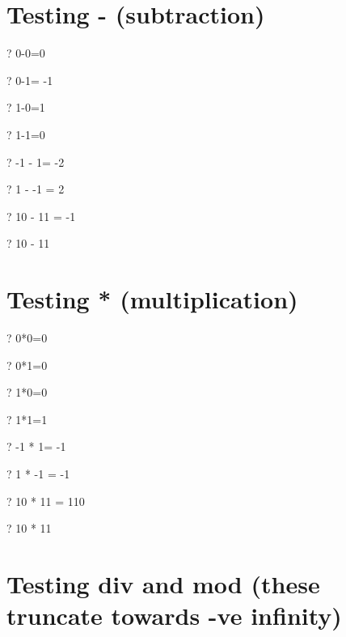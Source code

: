 \documentclass{article}
\newcommand{\negate}{-}
\begin{document}
\section{Testing - (subtraction)}
\begin{zed} \vdash?   0-0=0 \end{zed}
\begin{zed} \vdash?   0-1= \negate 1 \end{zed}
\begin{zed} \vdash?   1-0=1 \end{zed}
\begin{zed} \vdash?   1-1=0 \end{zed}
\begin{zed} \vdash?   \negate 1 - 1= \negate 2 \end{zed}
\begin{zed} \vdash?   1 - \negate 1 = 2 \end{zed}
\begin{zed} \vdash?   10 - 11 = \negate 1 \end{zed}
\begin{zed} \vdash?   10 - 11  \end{zed}


\section{Testing * (multiplication)}
\begin{zed} \vdash?   0*0=0 \end{zed}
\begin{zed} \vdash?   0*1=0 \end{zed}
\begin{zed} \vdash?   1*0=0 \end{zed}
\begin{zed} \vdash?   1*1=1 \end{zed}
\begin{zed} \vdash?   \negate 1 * 1= \negate 1 \end{zed}
\begin{zed} \vdash?   1 * \negate 1 = \negate 1 \end{zed}
\begin{zed} \vdash?   10 * 11 = 110 \end{zed}
\begin{zed} \vdash?   10 * 11  \end{zed}


\section{Testing div and mod   (these truncate towards -ve infinity)}
\end{document}
